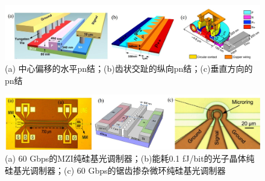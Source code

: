 \begin{figure}[htb]
	\centering
	\includegraphics[width=15cm]{./Pictures/fig_silicon_mod_cross.jpg}
	\caption{ (a) 中心偏移的水平pn结\cite{xiao2013high}；(b)齿状交趾的纵向pn结\cite{Xiao201360}；(c)垂直方向的pn结\cite{timurdogan2014ultralow}}
	\label{fig_silicon_mod_cross}
\end{figure}

\begin{figure}[htb]
	\centering
	\includegraphics[width=15cm]{./Pictures/fig_silicon_mod.jpg}
	\caption{ (a) 60 Gbps的MZI纯硅基光调制器\cite{Xiao201360}；(b)能耗0.1 fJ/bit的光子晶体纯硅基光调制器\cite{shakoor2014ultra}；(c) 60 Gbps的锯齿掺杂微环纯硅基光调制器\cite{Xiao201360}}
	\label{fig_silicon_mod}
\end{figure}
